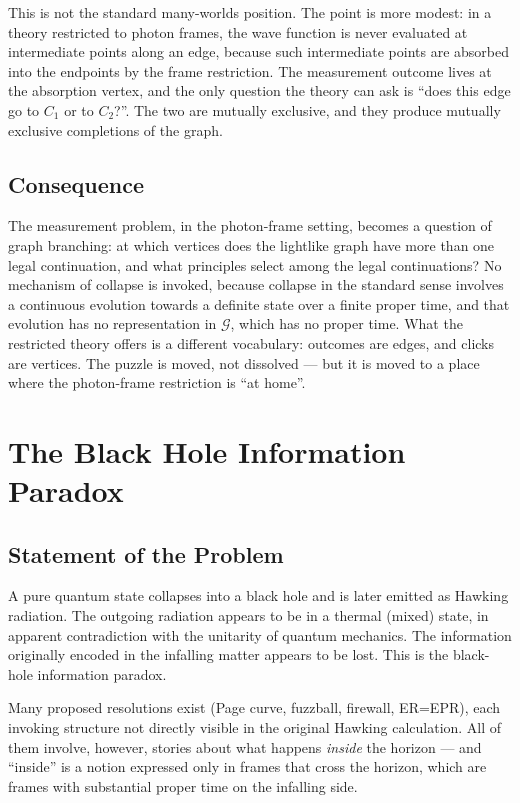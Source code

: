 \documentclass[11pt]{article}
\begin{document}
This is not the standard many-worlds position. The point is more modest: in a theory restricted to photon frames, the wave function is never evaluated at intermediate points along an edge, because such intermediate points are absorbed into the endpoints by the frame restriction. The measurement outcome lives at the absorption vertex, and the only question the theory can ask is ``does this edge go to $C_1$ or to $C_2$?''. The two are mutually exclusive, and they produce mutually exclusive completions of the graph.

\subsection{Consequence}

The measurement problem, in the photon-frame setting, becomes a question of graph branching: at which vertices does the lightlike graph have more than one legal continuation, and what principles select among the legal continuations? No mechanism of collapse is invoked, because collapse in the standard sense involves a continuous evolution towards a definite state over a finite proper time, and that evolution has no representation in $\mathcal{G}$, which has no proper time. What the restricted theory offers is a different vocabulary: outcomes are edges, and clicks are vertices. The puzzle is moved, not dissolved --- but it is moved to a place where the photon-frame restriction is ``at home''.

\section{The Black Hole Information Paradox}
\label{sec:bhi}

\subsection{Statement of the Problem}

A pure quantum state collapses into a black hole and is later emitted as Hawking radiation. The outgoing radiation appears to be in a thermal (mixed) state, in apparent contradiction with the unitarity of quantum mechanics. The information originally encoded in the infalling matter appears to be lost. This is the black-hole information paradox.

Many proposed resolutions exist (Page curve, fuzzball, firewall, ER=EPR), each invoking structure not directly visible in the original Hawking calculation. All of them involve, however, stories about what happens \emph{inside} the horizon --- and ``inside'' is a notion expressed only in frames that cross the horizon, which are frames with substantial proper time on the infalling side.
\end{document}
